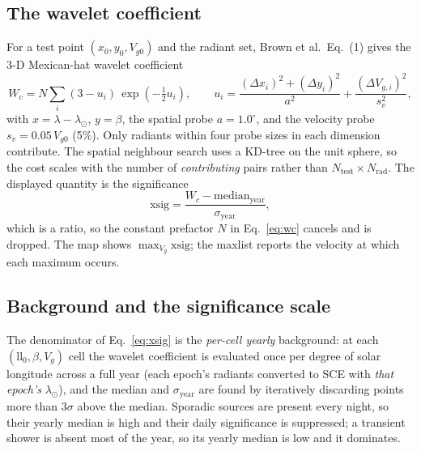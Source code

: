 \documentclass[11pt]{article}
\begin{document}
\subsection{The wavelet coefficient}
For a test point $(x_0,y_0,V_{g0})$ and the radiant set, Brown et al.\ Eq.~(1)
gives the 3-D Mexican-hat wavelet coefficient
\begin{equation}
W_c = N\sum_i \left(3 - u_i\right)\,\exp\!\left(-\tfrac{1}{2}u_i\right),
\qquad
u_i = \frac{(\Delta x_i)^2 + (\Delta y_i)^2}{a^2} + \frac{(\Delta V_{g,i})^2}{s_v^2},
\label{eq:wc}
\end{equation}
with $x = \lambda - \lambda_\odot$, $y = \beta$, the spatial probe
$a = 1.0^\circ$, and the velocity probe $s_v = 0.05\,V_{g0}$ (5\%). Only radiants
within four probe sizes in each dimension contribute. The spatial neighbour
search uses a KD-tree on the unit sphere, so the cost scales with the number of
\emph{contributing} pairs rather than $N_\mathrm{test}\times N_\mathrm{rad}$.
The displayed quantity is the significance
\begin{equation}
\mathrm{xsig} = \frac{W_c - \mathrm{median}_\mathrm{year}}{\sigma_\mathrm{year}} ,
\label{eq:xsig}
\end{equation}
which is a ratio, so the constant prefactor $N$ in Eq.~\eqref{eq:wc} cancels and
is dropped. The map shows $\max_{V_g}\mathrm{xsig}$; the maxlist reports the
velocity at which each maximum occurs.

\subsection{Background and the significance scale}
The denominator of Eq.~\eqref{eq:xsig} is the \emph{per-cell yearly} background:
at each $(\mathrm{ll}_0,\beta,V_g)$ cell the wavelet coefficient is evaluated once
per degree of solar longitude across a full year (each epoch's radiants converted
to SCE with \emph{that epoch's} $\lambda_\odot$), and the median and
$\sigma_\mathrm{year}$ are found by iteratively discarding points more than
$3\sigma$ above the median. Sporadic sources are present every night, so their
yearly median is high and their daily significance is suppressed; a transient
shower is absent most of the year, so its yearly median is low and it dominates.
\end{document}
